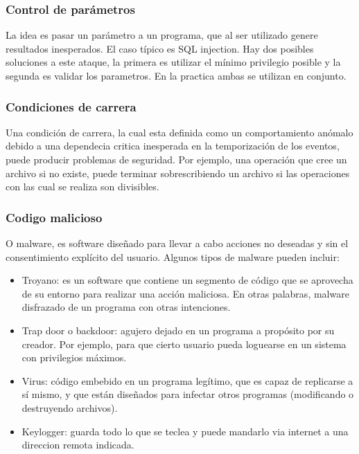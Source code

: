 \documentclass{article}
\begin{document}
\subsubsection{Control de parámetros}

La idea es pasar un parámetro a un programa, que al ser utilizado genere resultados
inesperados. El caso típico es SQL injection. Hay dos posibles soluciones a este ataque, la primera es utilizar el mínimo privilegio posible y la segunda es validar los parametros. En la practica ambas se utilizan en conjunto.


\subsubsection{Condiciones de carrera}


Una condición de carrera, la cual esta definida como un comportamiento anómalo debido a una dependecia critica inesperada en la temporización de los eventos, puede producir problemas de seguridad. Por ejemplo, una operación que cree un archivo si no existe, puede terminar sobrescribiendo un archivo si las operaciones con las cual se realiza son divisibles.

\subsubsection{Codigo malicioso}

O malware, es software diseñado para llevar a cabo acciones no deseadas y sin el consentimiento explícito del usuario. Algunos tipos de malware pueden incluir:
\begin{itemize}
\item Troyano: es un software que contiene un segmento de código que se aprovecha de su entorno para realizar una acción maliciosa. En otras palabras, malware disfrazado de un programa con otras intenciones.
\item Trap door o backdoor: agujero dejado en un programa a propósito por su creador. Por ejemplo, para que cierto usuario pueda loguearse en un sistema con privilegios máximos.
\item Virus: código embebido en un programa legítimo, que es capaz de replicarse a sí mismo, y que están diseñados para infectar otros programas (modificando o destruyendo archivos).
\item Keylogger: guarda todo lo que se teclea y puede mandarlo via internet a una direccion remota indicada.
\end{itemize}
\end{document}
